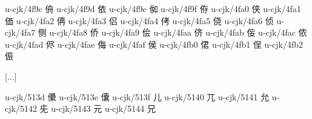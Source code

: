 \begin{multicols}{2}
u-cjk/4f9c	{\cjk{}侜}	
u-cjk/4f9d	{\cjk{}依}	
u-cjk/4f9e	{\cjk{}侞}	
u-cjk/4f9f	{\cjk{}侟}	
u-cjk/4fa0	{\cjk{}侠}	
u-cjk/4fa1	{\cjk{}価}	
u-cjk/4fa2	{\cjk{}侢}	
u-cjk/4fa3	{\cjk{}侣}	
u-cjk/4fa4	{\cjk{}侤}	
u-cjk/4fa5	{\cjk{}侥}	
u-cjk/4fa6	{\cjk{}侦}	
u-cjk/4fa7	{\cjk{}侧}	
u-cjk/4fa8	{\cjk{}侨}	
u-cjk/4fa9	{\cjk{}侩}	
u-cjk/4faa	{\cjk{}侪}	
u-cjk/4fab	{\cjk{}侫}	
u-cjk/4fac	{\cjk{}侬}	
u-cjk/4fad	{\cjk{}侭}	
u-cjk/4fae	{\cjk{}侮}	
u-cjk/4faf	{\cjk{}侯}	
u-cjk/4fb0	{\cjk{}侰}	
u-cjk/4fb1	{\cjk{}侱}	
u-cjk/4fb2	{\cjk{}侲}	

[...]

u-cjk/513d	{\cjk{}儽}	
u-cjk/513e	{\cjk{}儾}	
u-cjk/513f	{\cjk{}儿}	
u-cjk/5140	{\cjk{}兀}	
u-cjk/5141	{\cjk{}允}	
u-cjk/5142	{\cjk{}兂	}
u-cjk/5143	{\cjk{}元}	
u-cjk/5144	{\cjk{}兄}	


\end{multicols}
